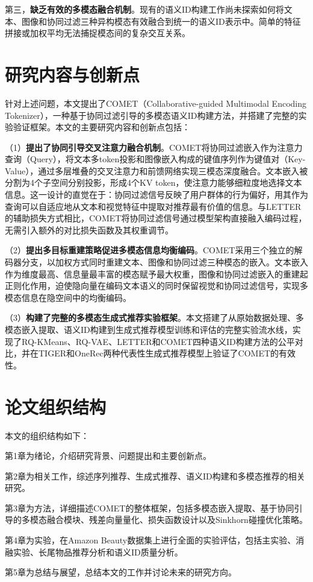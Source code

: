 第三，\textbf{缺乏有效的多模态融合机制}。现有的语义ID构建工作尚未探索如何将文本、图像和协同过滤三种异构模态有效融合到统一的语义ID表示中。简单的特征拼接或加权平均无法捕捉模态间的复杂交互关系。

\section{研究内容与创新点}

针对上述问题，本文提出了COMET（Collaborative-guided Multimodal Encoding Tokenizer），一种基于协同过滤引导的多模态语义ID构建方法，并搭建了完整的实验验证框架。本文的主要研究内容和创新点包括：

（1）\textbf{提出了协同引导交叉注意力融合机制}。COMET将协同过滤嵌入作为注意力查询（Query），将文本多token投影和图像嵌入构成的键值序列作为键值对（Key-Value），通过多层堆叠的交叉注意力和前馈网络实现三模态深度融合。文本嵌入被分割为4个子空间分别投影，形成4个KV token，使注意力能够细粒度地选择文本信息。这一设计的直觉在于：协同过滤信号反映了用户群体的行为偏好，用其作为查询可以自适应地从文本和视觉特征中提取对推荐最有价值的信息。与LETTER的辅助损失方式相比，COMET将协同过滤信号通过模型架构直接融入编码过程，无需引入额外的对比损失函数及其权重调节。

（2）\textbf{提出多目标重建策略促进多模态信息均衡编码}。COMET采用三个独立的解码器分支，以加权方式同时重建文本、图像和协同过滤三种模态的嵌入。文本嵌入作为维度最高、信息量最丰富的模态赋予最大权重，图像和协同过滤嵌入的重建起正则化作用，迫使隐向量在编码文本语义的同时保留视觉和协同过滤信号，实现多模态信息在隐空间中的均衡编码。

（3）\textbf{构建了完整的多模态生成式推荐实验框架}。本文搭建了从原始数据处理、多模态嵌入提取、语义ID构建到生成式推荐模型训练和评估的完整实验流水线，实现了RQ-KMeans、RQ-VAE、LETTER和COMET四种语义ID构建方法的公平对比，并在TIGER和OneRec两种代表性生成式推荐模型上验证了COMET的有效性。

\section{论文组织结构}

本文的组织结构如下：

第1章为绪论，介绍研究背景、问题提出和主要创新点。

第2章为相关工作，综述序列推荐、生成式推荐、语义ID构建和多模态推荐的相关研究。

第3章为方法，详细描述COMET的整体框架，包括多模态嵌入提取、基于协同引导的多模态融合模块、残差向量量化、损失函数设计以及Sinkhorn碰撞优化策略。

第4章为实验，在Amazon Beauty数据集上进行全面的实验评估，包括主实验、消融实验、长尾物品推荐分析和语义ID质量分析。

第5章为总结与展望，总结本文的工作并讨论未来的研究方向。
